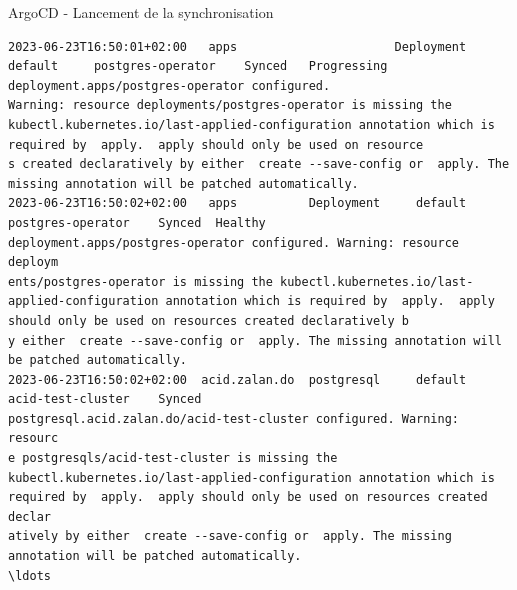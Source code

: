\begin{frame}[fragile,shrink=1]{ArgoCD - Lancement de la synchronisation}
\begin{tiny}
\begin{Verbatim}[commandchars=\\\{\}]
2023-06-23T16:50:01+02:00   apps                      Deployment             default     postgres-operator    Synced   Progressing              deployment.apps/postgres-operator configured. 
Warning: resource deployments/postgres-operator is missing the kubectl.kubernetes.io/last-applied-configuration annotation which is required by  apply.  apply should only be used on resource
s created declaratively by either  create --save-config or  apply. The missing annotation will be patched automatically.                                                                      
2023-06-23T16:50:02+02:00   apps          Deployment     default     postgres-operator    Synced  Healthy              deployment.apps/postgres-operator configured. Warning: resource deploym
ents/postgres-operator is missing the kubectl.kubernetes.io/last-applied-configuration annotation which is required by  apply.  apply should only be used on resources created declaratively b
y either  create --save-config or  apply. The missing annotation will be patched automatically.                                                                                               
2023-06-23T16:50:02+02:00  acid.zalan.do  postgresql     default     acid-test-cluster    Synced                       postgresql.acid.zalan.do/acid-test-cluster configured. Warning: resourc
e postgresqls/acid-test-cluster is missing the kubectl.kubernetes.io/last-applied-configuration annotation which is required by  apply.  apply should only be used on resources created declar
atively by either  create --save-config or  apply. The missing annotation will be patched automatically.
\ldots
\end{Verbatim}
\end{tiny}

\end{frame}


